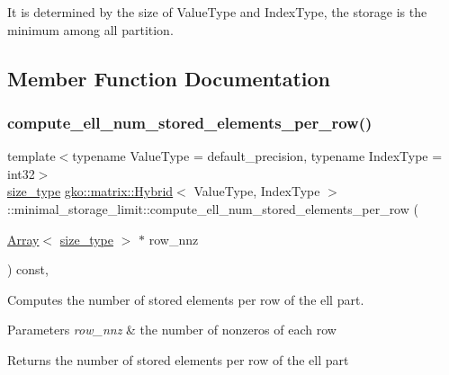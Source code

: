 It is determined by the size of Value\+Type and Index\+Type, the storage is the minimum among all partition. 

\subsection{Member Function Documentation}
\mbox{\label{classgko_1_1matrix_1_1Hybrid_1_1minimal__storage__limit_a381273c294099363637e40cb536fa63a}} 
\subsubsection{\texorpdfstring{compute\+\_\+ell\+\_\+num\+\_\+stored\+\_\+elements\+\_\+per\+\_\+row()}{compute\_ell\_num\_stored\_elements\_per\_row()}}
{\footnotesize\ttfamily template$<$typename Value\+Type = default\+\_\+precision, typename Index\+Type = int32$>$ \\
\hyperlink{namespacegko_a6e5c95df0ae4e47aab2f604a22d98ee7}{size\+\_\+type} \hyperlink{classgko_1_1matrix_1_1Hybrid}{gko\+::matrix\+::\+Hybrid}$<$ Value\+Type, Index\+Type $>$\+::minimal\+\_\+storage\+\_\+limit\+::compute\+\_\+ell\+\_\+num\+\_\+stored\+\_\+elements\+\_\+per\+\_\+row (\begin{DoxyParamCaption}\item[{\hyperlink{classgko_1_1Array}{Array}$<$ \hyperlink{namespacegko_a6e5c95df0ae4e47aab2f604a22d98ee7}{size\+\_\+type} $>$ $\ast$}]{row\+\_\+nnz }\end{DoxyParamCaption}) const\hspace{0.3cm}{\ttfamily [override]}, {\ttfamily [virtual]}}



Computes the number of stored elements per row of the ell part. 


\begin{DoxyParams}{Parameters}
{\em row\+\_\+nnz} & the number of nonzeros of each row\\
\hline
\end{DoxyParams}
\begin{DoxyReturn}{Returns}
the number of stored elements per row of the ell part 
\end{DoxyReturn}


